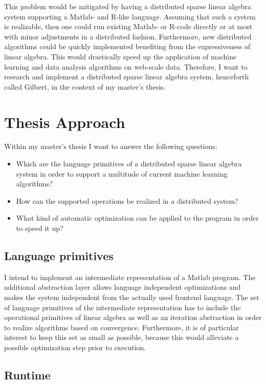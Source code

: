 \documentclass{dima}
\begin{document}
This problem would be mitigated by having a distributed sparse linear algebra system supporting a Matlab- and R-like language.
Assuming that such a system is realizable, then one could run existing Matlab- or R-code directly or at most with minor adjustments in a distributed fashion.
Furthermore, new distributed algorithms could be quickly implemented benefiting from the expressiveness of linear algebra.
This would drastically speed up the application of machine learning and data analysis algorithms on web-scale data.
Therefore, I want to research and implement a distributed sparse linear algebra system, henceforth called Gilbert, in the context of my master's thesis.


\section{Thesis Approach}

Within my master's thesis I want to answer the following questions:
\begin{itemize}
\item Which are the language primitives of a distributed sparse linear algebra system in order to support a multitude of current machine learning algorithms?
\item How can the supported operations be realized in a distributed system?
\item What kind of automatic optimization can be applied to the program in order to speed it up?
\end{itemize}

\subsection{Language primitives}

I intend to implement an intermediate representation of a Matlab program.
The additional abstraction layer allows language independent optimizations and makes the system independent from the actually used frontend language.
The set of language primitives of the intermediate representation has to include the operational primitives of linear algebra as well as an iteration abstraction in order to realize algorithms based on convergence.
Furthermore, it is of particular interest to keep this set as small as possible, because this would alleviate a possible optimization step prior to execution.

\subsection{Runtime}
\end{document}
